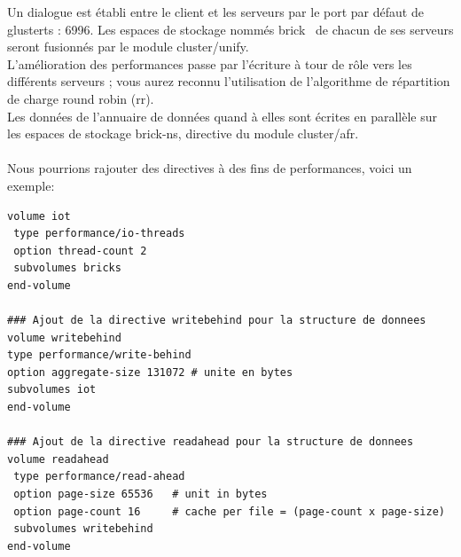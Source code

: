 \documentclass[12pt]{report}
\begin{document}
Un dialogue est établi entre le client et les serveurs par le port par défaut de glusterts : 6996. Les espaces de stockage nommés \og brick\fg~ de chacun de ses serveurs seront fusionnés par le module \og cluster/unify\fg.\\ L'amélioration des performances passe par l'écriture à tour de rôle vers les différents serveurs ; vous aurez reconnu l'utilisation de l'algorithme de répartition de charge round robin (rr).\\
Les données de l'annuaire de données quand à elles sont écrites en parallèle sur les espaces de stockage \og brick-ns\fg, directive du module \og cluster/afr\fg.\\\\
Nous pourrions rajouter des directives à des fins de performances, voici un exemple:
\begin{lstlisting}
volume iot
 type performance/io-threads
 option thread-count 2
 subvolumes bricks
end-volume

### Ajout de la directive writebehind pour la structure de donnees
volume writebehind
type performance/write-behind
option aggregate-size 131072 # unite en bytes
subvolumes iot
end-volume

### Ajout de la directive readahead pour la structure de donnees
volume readahead
 type performance/read-ahead
 option page-size 65536   # unit in bytes
 option page-count 16     # cache per file = (page-count x page-size)
 subvolumes writebehind
end-volume
	  \end{lstlisting}
\end{document}

